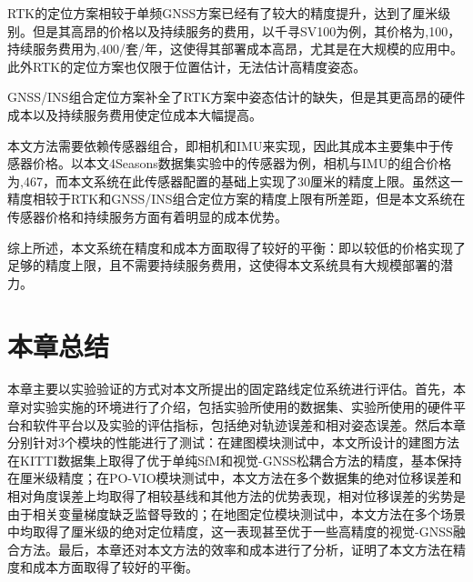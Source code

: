 RTK的定位方案相较于单频GNSS方案已经有了较大的精度提升，达到了厘米级别。但是其高昂的价格以及持续服务的费用，以千寻SV100\cite{SV100}为例，其价格为,100，持续服务费用为,400/套/年，这使得其部署成本高昂，尤其是在大规模的应用中。此外RTK的定位方案也仅限于位置估计，无法估计高精度姿态。

GNSS/INS组合定位方案补全了RTK方案中姿态估计的缺失，但是其更高昂的硬件成本以及持续服务费用使定位成本大幅提高。

本文方法需要依赖传感器组合，即相机和IMU来实现，因此其成本主要集中于传感器价格。以本文4Seasons数据集实验中的传感器为例，相机与IMU的组合价格为,467，而本文系统在此传感器配置的基础上实现了30厘米的精度上限。虽然这一精度相较于RTK和GNSS/INS组合定位方案的精度上限有所差距，但是本文系统在传感器价格和持续服务方面有着明显的成本优势。

综上所述，本文系统在精度和成本方面取得了较好的平衡：即以较低的价格实现了足够的精度上限，且不需要持续服务费用，这使得本文系统具有大规模部署的潜力。


\section{本章总结}

本章主要以实验验证的方式对本文所提出的固定路线定位系统进行评估。首先，本章对实验实施的环境进行了介绍，包括实验所使用的数据集、实验所使用的硬件平台和软件平台以及实验的评估指标，包括绝对轨迹误差和相对姿态误差。然后本章分别针对3个模块的性能进行了测试：在建图模块测试中，本文所设计的建图方法在KITTI数据集上取得了优于单纯SfM和视觉-GNSS松耦合方法的精度，基本保持在厘米级精度；在PO-VIO模块测试中，本文方法在多个数据集的绝对位移误差和相对角度误差上均取得了相较基线和其他方法的优势表现，相对位移误差的劣势是由于相关变量梯度缺乏监督导致的；在地图定位模块测试中，本文方法在多个场景中均取得了厘米级的绝对定位精度，这一表现甚至优于一些高精度的视觉-GNSS融合方法。最后，本章还对本文方法的效率和成本进行了分析，证明了本文方法在精度和成本方面取得了较好的平衡。
